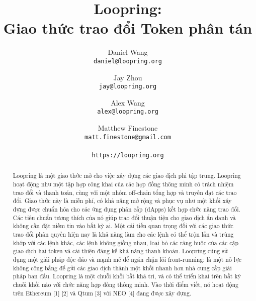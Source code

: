\documentclass[12pt,a4paper]{article}
\title{\textbf{Loopring:}\\\textbf{Giao thức trao đổi Token phân tán}}
\author{
  Daniel Wang\\
  \texttt{daniel@loopring.org}\\
  \and
  	Jay Zhou\\
  	\texttt{jay@loopring.org}\\
  	\and
  	Alex Wang\\
  	\texttt{alex@loopring.org}\\
  	\and
  	Matthew Finestone\\
  	\texttt{matt.finestone@gmail.com}\\
  \\
  \texttt{https://loopring.org}
 }
\begin{document}
\maketitle

\begin{abstract}
Loopring là một giao thức mở cho việc xây dựng các giao dịch phi tập trung.  Loopring hoạt động như một tập hợp công khai của các hợp đồng thông minh có trách nhiệm trao đổi và thanh toán, cùng với một nhóm off-chain tổng hợp và truyền đạt các trao đổi. Giao thức này là miễn phí, có khả năng mở rộng và phục vụ như một khối xây dựng được chuẩn hóa cho các ứng dụng phân cấp (dApps) kết hợp chức năng trao đổi. Các tiêu chuẩn tương thích của nó giúp trao đổi thuận tiện cho giao dịch ẩn danh và không cần đặt niềm tin vào bất kỳ ai. Một cải tiến quan trọng đối với các giao thức trao đổi phân quyền hiện nay là khả năng làm cho các lệnh có thể trộn lẫn và trùng khớp với các lệnh khác, các lệnh không giống nhau, loại bỏ các ràng buộc của các cặp giao dịch hai token và cải thiện đáng kể khả năng thanh khoản. Loopring cũng sử dụng một giải pháp độc đáo và mạnh mẽ để ngăn chặn lỗi front-running: là một nỗ lực không công bằng để gửi các giao dịch thành một khối nhanh hơn nhà cung cấp giải pháp ban đầu. Loopring là một chuỗi khối bất khả tri, và có thể triển khai trên bất kỳ chuỗi khối nào với chức năng hợp đồng thông minh. Vào thời điểm viết, nó hoạt động trên Ethereum [1] [2] và Qtum [3] với NEO [4] đang được xây dựng.
\end{abstract}
\end{document}
